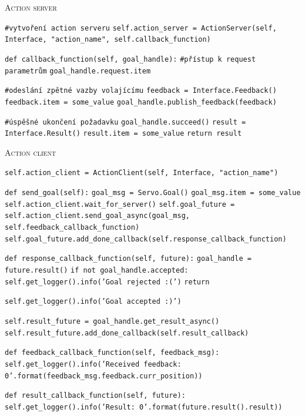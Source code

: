 \begin{algorithm}[h!]
	\label{}
	\caption{\textsc{Action server}}
	
	\DontPrintSemicolon
	\SetAlgoNoLine
	\SetNlSty{}{}{:}
	\SetNlSkip{-1.1em}
	
	\BlankLine \Indp\Indpp
	
	\texttt{\#vytvoření action serveru}\;
	\texttt{self.action\_server = ActionServer(self, Interface, "action\_name", self.callback\_function)}\;
	
	\BlankLine
	\texttt{def callback\_function(self, goal\_handle):}\;
	\Indp\Indp
	\texttt{\#přístup k request parametrům}\;
	\texttt{goal\_handle.request.item}\;
	
	\BlankLine
	\texttt{\#odeslání zpětné vazby volajícímu}\;
	\texttt{feedback = Interface.Feedback()}\;
	\texttt{feedback.item = some\_value}\;
	\texttt{goal\_handle.publish\_feedback(feedback)}\;
	
	\BlankLine
	\texttt{\#úspěšné ukončení požadavku}\;
	\texttt{goal\_handle.succeed()}\;
	\texttt{result = Interface.Result()}\;
	\texttt{result.item = some\_value}\;
	\texttt{return result}\;
\end{algorithm}


\begin{algorithm}[h!]
	\label{}
	\caption{\textsc{Action client}}
	
	\DontPrintSemicolon
	\SetAlgoNoLine
	\SetAlgoNlRelativeSize{-1}
	\SetNlSty{}{}{:}
	\SetNlSkip{-1.1em}
	
	\BlankLine \Indp\Indpp
	
 	\texttt{self.action\_client = ActionClient(self, Interface, "action\_name")}\;
 	
 	\BlankLine
 	\texttt{def send\_goal(self):}\;
 	\Indp\Indp
 	\texttt{goal\_msg = Servo.Goal()}\;
 	\texttt{goal\_msg.item = some\_value}\;
 	\texttt{self.action\_client.wait\_for\_server()}\;
 	\texttt{self.goal\_future = self.action\_client.send\_goal\_async(goal\_msg, self.feedback\_callback\_function)}\;
 	\texttt{self.goal\_future.add\_done\_callback(self.response\_callback\_function)}\;
	\Indm\Indm

	\BlankLine
 	\texttt{def response\_callback\_function(self, future):}\;
 	\Indp\Indp
 	\texttt{goal\_handle = future.result()}\;
 	\texttt{if not goal\_handle.accepted:}\;
 	\texttt{self.get\_logger().info('Goal rejected :(')}\;
 	\texttt{return}\;

 	\texttt{self.get\_logger().info('Goal accepted :)')}\;

 	\texttt{self.result\_future = goal\_handle.get\_result\_async()}\;
 	\texttt{self.result\_future.add\_done\_callback(self.result\_callback)}\;
	\Indm\Indm

 	\BlankLine
 	\texttt{def feedback\_callback\_function(self, feedback\_msg):}\;
 	\Indp\Indp
 	\texttt{self.get\_logger().info('Received feedback: {0}'.format(feedback\_msg.feedback.curr\_position))}\;
	\Indm\Indm

	\BlankLine
 	\texttt{def result\_callback\_function(self, future):}\;
 	\Indp\Indp
 	\texttt{self.get\_logger().info('Result: {0}'.format(future.result().result))}\;
\end{algorithm}

